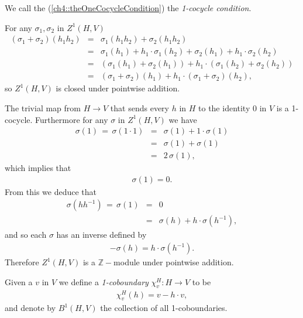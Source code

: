 We call the (\ref{ch4::theOneCocycleCondition}) the \emph{1-cocycle condition}.

For any $\sigma_1, \sigma_2$ in $Z^1\left(H, V\right)$
\begin{eqnarray*}
	\left(\sigma_1 + \sigma_2\right)(h_1h_2) &=& \sigma_1(h_1h_2) +  \sigma_2(h_1h_2) \\
	&=& \sigma_1(h_1) + h_1\cdot\sigma_1(h_2) +  \sigma_2(h_1) + h_1\cdot\sigma_2(h_2)\\
	&=& \left( \sigma_1(h_1) + \sigma_2(h_1) \right) + h_1\cdot\left(\sigma_1(h_2) + \sigma_2(h_2)\right) \\
	&=& \left(\sigma_1+\sigma_2\right)(h_1) + h_1\cdot\left(\sigma_1 + \sigma_2\right)(h_2),
\end{eqnarray*}
so $Z^1(H, V)$ is closed under pointwise addition.

The trivial map from $H \rightarrow V$ that sends every $h$ in $H$ to the identity 0 in $V$ is a 1-cocycle. Furthermore for any $\sigma$ in $Z^1(H, V)$ we have
\begin{eqnarray*}
	\sigma(1)\, =\, \sigma(1\cdot 1) &=& \sigma(1) + 1\cdot \sigma(1) \\
	&=& \sigma(1) + \sigma(1) \\
	&=& 2\,\sigma(1),
\end{eqnarray*}
which implies that
\begin{eqnarray*}
\sigma(1) = 0.
\end{eqnarray*}
From this we deduce that
\begin{eqnarray*}
	\sigma(hh^{-1})\, =\, \sigma(1) &=& 0 \\
	&=& \sigma(h) + h\cdot \sigma(h^{-1}),
\end{eqnarray*}
and so each $\sigma$ has an inverse defined by
\begin{eqnarray*}
	-\sigma(h) = h\cdot\sigma(h^{-1}).
\end{eqnarray*}
Therefore $Z^1\left(H, V\right)$ is a $\mathbb{Z}-$module under pointwise addition.

Given a $v$ in $V$ we define a \emph{1-coboundary} $\chi^H_v:H\rightarrow V$ to be
\begin{eqnarray*}
	\chi^H_v (h) = v - h\cdot v,
\end{eqnarray*}
and denote by $B^1\left(H, V\right)$ the collection of all 1-coboundaries. 

